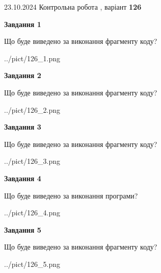 \documentclass[12pt, ukrainian]{article}
\begin{document}
{\Large{23.10.2024 Контрольна робота , варіант  \No \textbf { 126 }\par}}
{
\begin {large}
{\begin {center}\textbf{Завдання 1}\end {center}}

Що буде виведено за виконання фрагменту коду?\par
\begin{center}
	{../pict/126_1.png}
\end{center}
\newpage

{\begin {center}\textbf{Завдання 2}\end {center}}

Що буде виведено за виконання фрагменту коду?\par
\begin{center}
	{../pict/126_2.png}
\end{center}
\newpage

{\begin {center}\textbf{Завдання 3}\end {center}}

Що буде виведено за виконання фрагменту коду?\par
\begin{center}
	{../pict/126_3.png}
\end{center}
\newpage

{\begin {center}\textbf{Завдання 4}\end {center}}

Що буде виведено за виконання програми?\par
\begin{center}
	{../pict/126_4.png}
\end{center}
\newpage

{\begin {center}\textbf{Завдання 5}\end {center}}

Що буде виведено за виконання фрагменту коду?\par
\begin{center}
	{../pict/126_5.png}
\end{center}
\newpage


\end{large}}
\end{document}
